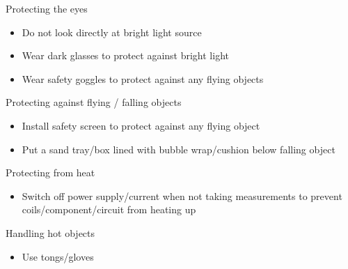 \documentclass{article}
\begin{document}
\begin{flushleft}
Protecting the eyes
\end{flushleft}
\begin{itemize}
    \item Do not look directly at bright light source
    \item Wear dark glasses to protect against bright light
    \item Wear safety goggles to protect against any flying objects
\end{itemize}
\begin{flushleft}
Protecting against flying / falling objects
\end{flushleft}
\begin{itemize}
    \item Install safety screen to protect against any flying object
    \item  Put a sand tray/box lined with bubble wrap/cushion below falling object
\end{itemize}
\begin{flushleft}
Protecting from heat
\end{flushleft}
\begin{itemize}
    \item Switch off power supply/current when not taking measurements to prevent coils/component/circuit from heating up
\end{itemize}
\begin{flushleft}
Handling hot objects
\end{flushleft}
\begin{itemize}
    \item Use tongs/gloves
\end{itemize}
\end{document}
